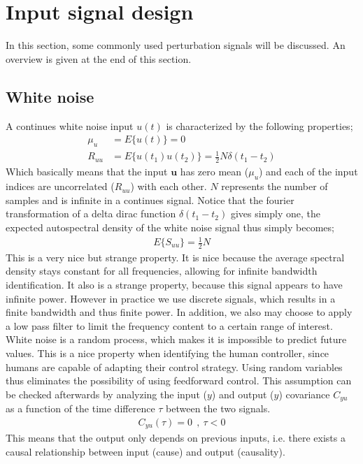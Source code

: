 \section{Input signal design}
In this section, some commonly used perturbation signals will be discussed. An overview is given at the end of this section.
\subsection{White noise}
A continues white noise input ${u(t)}$ is characterized by the following properties;
	\begin{align}
			\mu_u &= E\{{u}(t)\} = 0  \\
			R_{uu} &= E\{{u}(t_1){u}(t_2)\} = \tfrac{1}{2}N\delta(t_1-t_2)
	\end{align}
Which basically means that the input $\mathbf{u}$ has zero mean ($\mu_u$) and each of the input indices are uncorrelated ($R_{uu}$) with each other. $N$ represents the number of samples and is infinite in a continues signal. Notice that the fourier transformation of a delta dirac function $\delta(t_1-t_2)$ gives simply one, the expected autospectral density of the white noise signal thus simply becomes;
	\begin{align}
			E\{S_{uu}\} = \tfrac{1}{2}N
	\end{align}
This is a very nice but strange property. It is nice because the average spectral density stays constant for all frequencies, allowing for infinite bandwidth identification. It also is a strange property, because this signal appears to have infinite power. However in practice we use discrete signals, which results in a finite bandwidth and thus finite power. In addition, we also may choose to apply a low pass filter to limit the frequency content to a certain range of interest.
		White noise is a random process, which makes it is impossible to predict future values. This is a nice property when identifying the human controller, since humans are capable of adapting their control strategy. Using random variables thus eliminates the possibility of using feedforward control. This assumption can be checked afterwards by analyzing the input ($y$) and output ($y$) covariance $C_{yu}$ as a function of the time difference $\tau$ between the two signals. 
	\begin{align}
			C_{yu} (\tau) = 0 \ \ , \ \tau < 0  
	\end{align}
This means that the output only depends on previous inputs, i.e. there exists a causal relationship between input (cause) and output (causality).
